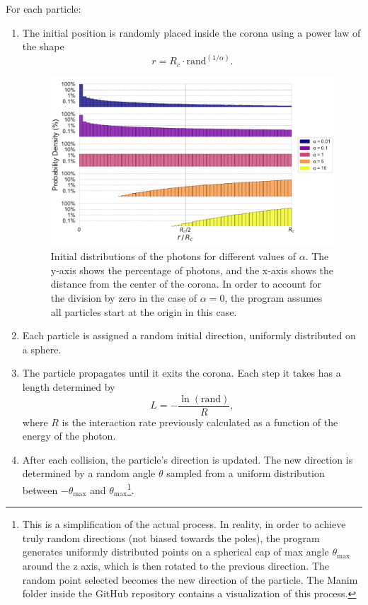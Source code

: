 For each particle:
\begin{enumerate}
\item The initial position is randomly placed inside the corona using a power law of the shape
\begin{equation}
r = R_c \cdot \text{rand}^{(1/\alpha)}.
\label{eq:alpha}
\end{equation}
\begin{figure}[ht]
    \includegraphics[width=\textwidth]{Figures/InitialDistributions.pdf}
    \centering
    \caption{Initial distributions of the photons for different values of $\alpha$. The y-axis shows the percentage of photons, and the x-axis shows the distance from the center of the corona. In order to account for the division by zero in the case of $\alpha=0$, the program assumes all particles start at the origin in this case.}
    \label{fig:initial_distributions}
\end{figure}

\item Each particle is assigned a random initial direction, uniformly distributed on a sphere.
\item The particle propagates until it exits the corona. Each step it takes has a length determined by
\begin{equation}
L = -\frac{\ln (\text{rand})}{R},
\end{equation}
where $R$ is the interaction rate previously calculated as a function of the energy of the photon.
\item After each collision, the particle's direction is updated. The new direction is determined by a random angle $\theta$ sampled from a uniform distribution between $-\theta_{\max}$ and $\theta_{\max}$\footnote{This is a simplification of the actual process. In reality, in order to achieve truly random directions (not biased towards the poles), the program generates uniformly distributed points on a spherical cap of max angle $\theta_{\max}$ around the z axis, which is then rotated to the previous direction. The random point selected becomes the new direction of the particle. The Manim folder inside the GitHub repository contains a visualization of this process.}.


\end{enumerate}
